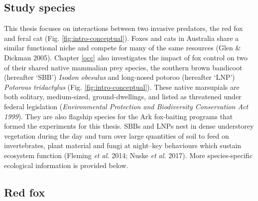 \documentclass[11pt,a4paper,titlepage,twoside,openright]{style/unimelbthesis}
\begin{document}
\begin{mainmatter}
\hypertarget{study-species}{%
\section{Study species}\label{study-species}}

This thesis focuses on interactions between two invasive predators, the red fox and feral cat (Fig. \ref{fig:intro-conceptual}). Foxes and cats in Australia share a similar functional niche and compete for many of the same resources (Glen \& Dickman 2005). Chapter \ref{occ} also investigates the impact of fox control on two of their shared native mammalian prey species, the southern brown bandicoot (hereafter `SBB') \emph{Isodon obesulus} and long-nosed potoroo (hereafter `LNP') \emph{Potorous tridactylus} (Fig. \ref{fig:intro-conceptual}). These native marsupials are both solitary, medium-sized, ground-dwellings, and listed as threatened under federal legislation (\emph{Environmental Protection and Biodiversity Conservation Act 1999}). They are also flagship species for the Ark fox-baiting programs that formed the experiments for this thesis. SBBs and LNPs nest in dense understorey vegetation during the day and turn over large quantities of soil to feed on invertebrates, plant material and fungi at night--key behaviours which sustain ecosystem function (Fleming \emph{et al.} 2014; Nuske \emph{et al.} 2017). More species-specific ecological information is provided below.

\hypertarget{red-fox}{%
\subsection{Red fox}\label{red-fox}}


\end{mainmatter}
\end{document}
